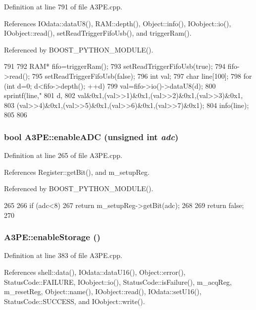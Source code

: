Definition at line 791 of file A3PE.cpp.

References IOdata::dataU8(), RAM::depth(), Object::info(), IOobject::io(), IOobject::read(), setReadTriggerFifoUsb(), and triggerRam().

Referenced by BOOST\_\-PYTHON\_\-MODULE().


\begin{DoxyCode}
791                       {
792   RAM* fifo=triggerRam();
793   setReadTriggerFifoUsb(true);
794   fifo->read();
795   setReadTriggerFifoUsb(false);
796   int val;
797   char line[100];
798   for (int d=0; d<fifo->depth(); ++d){
799     val=fifo->io()->dataU8(d);
800     sprintf(line,"%
801         d,
802         val&0x1,(val>>1)&0x1,(val>>2)&0x1,(val>>3)&0x1,
803         (val>>4)&0x1,(val>>5)&0x1,(val>>6)&0x1,(val>>7)&0x1);
804     info(line);
805   }
806 }
\end{DoxyCode}
\hypertarget{classA3PE_a02608198bd28bc61882f27368fd90db1}{
\subsubsection[{enableADC}]{\setlength{\rightskip}{0pt plus 5cm}bool A3PE::enableADC (unsigned int {\em adc})}}
\label{classA3PE_a02608198bd28bc61882f27368fd90db1}


Definition at line 265 of file A3PE.cpp.

References Register::getBit(), and m\_\-setupReg.

Referenced by BOOST\_\-PYTHON\_\-MODULE().


\begin{DoxyCode}
265                                     {
266   if (adc<8){
267     return m_setupReg->getBit(adc);
268   }
269   return false;
270 }
\end{DoxyCode}
\hypertarget{classA3PE_a2071d7922f140ee6705da954efb685f7}{
\subsubsection[{enableStorage}]{ A3PE::enableStorage ()}}
\label{classA3PE_a2071d7922f140ee6705da954efb685f7}


Definition at line 383 of file A3PE.cpp.

References shell::data(), IOdata::dataU16(), Object::error(), StatusCode::FAILURE, IOobject::io(), StatusCode::isFailure(), m\_\-acqReg, m\_\-resetReg, Object::name(), IOobject::read(), IOdata::setU16(), StatusCode::SUCCESS, and IOobject::write().


